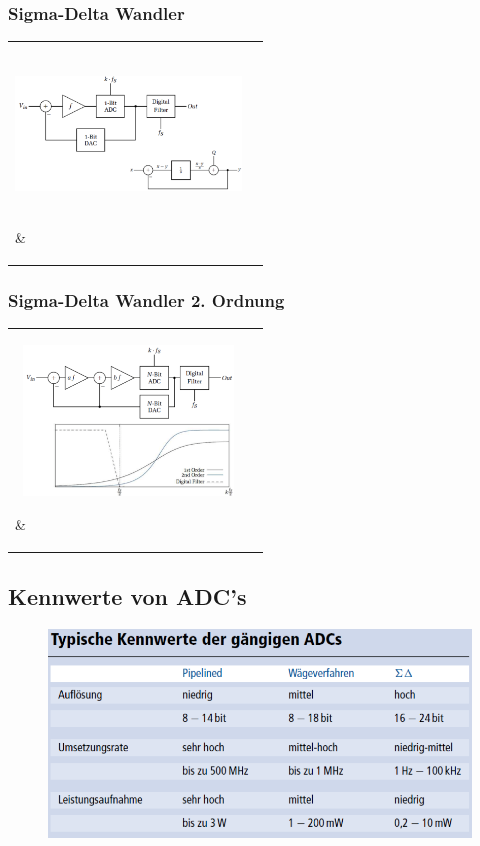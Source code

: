 \subsubsection{Sigma-Delta Wandler }
\begin{tabular}{p{}|l}
  \parbox[c][6cm]{0.31\textwidth}{\includegraphics[width=6cm, height =
  4cm]{pictures/deltaSigma1}}
  &
  \\
\end{tabular}


\subsubsection{Sigma-Delta Wandler 2. Ordnung }
\begin{tabular}{p{}|l}
  \parbox[c][6cm]{0.31\textwidth}{\includegraphics[width=6cm, height =
  4cm]{pictures/deltaSigma2}}
  & \\

\end{tabular}


\subsection{Kennwerte von ADC's}
\begin{figure}[!htbp]
\includegraphics[scale=0.4]{pictures/kennwerteADC}
\end{figure}

